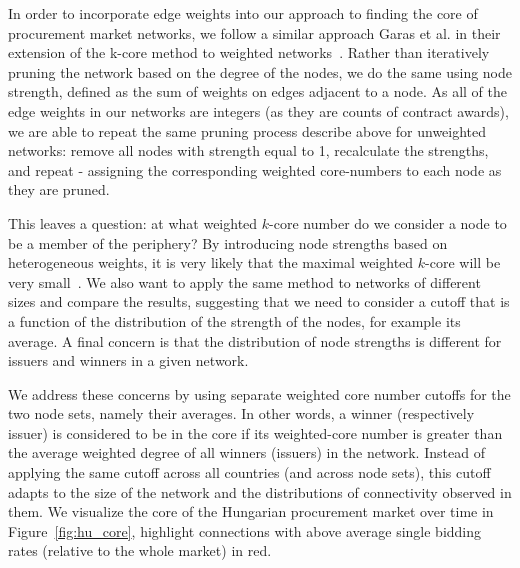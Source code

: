 In order to incorporate edge weights into our approach to finding the core of procurement market networks, we follow a similar approach Garas et al. in their extension of the k-core method to weighted networks~\cite{garas2012k}. Rather than iteratively pruning the network based on the degree of the nodes, we do the same using node strength, defined as the sum of weights on edges adjacent to a node. As all of the edge weights in our networks are integers (as they are counts of contract awards), we are able to repeat the same pruning process describe above for unweighted networks: remove all nodes with strength equal to 1, recalculate the strengths, and repeat - assigning the corresponding weighted core-numbers to each node as they are pruned.

This leaves a question: at what weighted $k$-core number do we consider a node to be a member of the periphery? By introducing node strengths based on heterogeneous weights, it is very likely that the maximal weighted $k$-core will be very small~\cite{garas2012k}. We also want to apply the same method to networks of different sizes and compare the results, suggesting that we need to consider a cutoff that is a function of the distribution of the strength of the nodes, for example its average. A final concern is that the distribution of node strengths is different for issuers and winners in a given network.

We address these concerns by using separate weighted core number cutoffs for the two node sets, namely their averages. In other words, a winner (respectively issuer) is considered to be in the core if its weighted-core number is greater than the average weighted degree of all winners (issuers) in the network. Instead of applying the same cutoff across all countries (and across node sets), this cutoff adapts to the size of the network and the distributions of connectivity observed in them. We visualize the core of the Hungarian procurement market over time in Figure~\ref{fig:hu_core}, highlight connections with above average single bidding rates (relative to the whole market) in red. 

